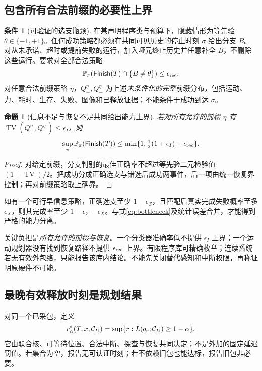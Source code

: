 \documentclass[11pt,a4paper,fontset=fandol]{ctexart}
\newtheorem{proposition}[theorem]{命题}
\theoremstyle{definition}
\newtheorem{assumption}[theorem]{条件}
\theoremstyle{remark}\newtheorem{remark}[theorem]{说明}
\numberwithin{equation}{section}
\newcommand{\TV}{\operatorname{TV}}\newcommand{\supp}{\operatorname{supp}}
\newcommand{\Finish}{\mathsf{Finish}}\newcommand{\Win}{\mathsf{Win}}
\begin{document}
\subsection{包含所有合法前缀的必要性上界}
\begin{assumption}[可验证的选支瓶颈]
在某声明程序类与预算下，隐藏情形为等先验 $\theta\in\{-1,+1\}$。任何成功策略都必须在共同可见历史的停止时刻 $\sigma$ 给出分支 $B$。对从未承诺、超时或提前失败的运行，加入哑元终止历史并任意补全 $B$，不删除这些运行。要求对全部合法策略
\[
 \Prb_\pi(\Finish(T)\cap\{B\ne\theta\})\le\epsilon_{\rm rec}.
\]
对任意合法前缀策略 $\eta$，$Q_+^\eta,Q_-^\eta$ 为上述\emph{未条件化的完整}前缀分布，包括运动、力、耗时、生存、失败、图像和已释放证据；不能条件于成功到达 $\sigma$。
\end{assumption}
\begin{proposition}[信息不足与恢复不足共同给出能力上界]
若对所有允许的前缀 $\eta$ 有 $\TV(Q_+^\eta,Q_-^\eta)\le\epsilon_I$，则
\begin{equation}
 \sup_\pi\Prb_\pi(\Finish(T))
 \le\min\{1,\tfrac12(1+\epsilon_I)+\epsilon_{\rm rec}\}.
 \label{eq:bottleneck}
\end{equation}
\end{proposition}
\begin{proof}
对给定前缀，分支判别的最佳正确率不超过等先验二元检验值 $(1+\TV)/2$。把成功分成正确选支与错选后成功两事件，后一项由统一恢复界控制；再对前缀策略取上确界。
\end{proof}
如有一个可行早信息策略，正确选支至少 $1-\epsilon_Z$，且匹配后真实完成失败概率至多 $\epsilon_X$，则其完成率至少 $1-\epsilon_Z-\epsilon_X$。与式\eqref{eq:bottleneck}及统计误差合并，才能得到严格的能力分离。

关键负担是\emph{所有允许的前缀与恢复}。一个分类器准确率低不提供 $\epsilon_I$ 上界；一个运动规划器没有找到恢复路径不提供 $\epsilon_{\rm rec}$ 上界。有限程序库可精确枚举；连续系统若无有效外包络，只能报告该库内结论。不能先关闭替代感知和中断权限，再称证明原硬件不可能。

\subsection{最晚有效释放时刻是规划结果}
对同一个已采包，定义
\begin{equation}
 r_\alpha^*(T,x,\mathcal C_D)=\sup\{r:L(q_r;\mathcal C_D)\ge1-\alpha\}.
 \label{eq:latest}
\end{equation}
它由联合核、可等待位置、合法中断、探查与恢复共同决定；不是外加的固定延迟罚值。若集合为空，报告无可认证时刻；若不依赖旧包也能达标，报告旧包非必要。
\end{document}
